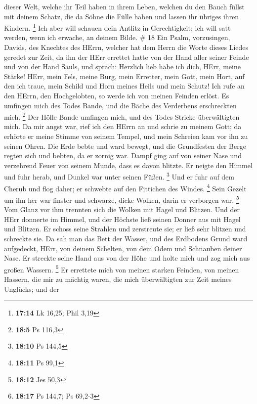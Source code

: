 dieser Welt, welche ihr Teil haben in ihrem Leben, welchen du den Bauch
füllst mit deinem Schatz, die da Söhne die Fülle haben und lassen ihr
übriges ihren Kindern. \footnote{\textbf{17:14} Lk 16,25; Phil 3,19}
 Ich aber will schauen dein Antlitz in Gerechtigkeit; ich
will satt werden, wenn ich erwache, an deinem Bilde. \# 18 
Ein Psalm, vorzusingen, Davids, des Knechtes des HErrn, welcher hat dem
Herrn die Worte dieses Liedes geredet zur Zeit, da ihn der HErr errettet
hatte von der Hand aller seiner Feinde und von der Hand Sauls,
 und sprach: Herzlich lieb habe ich dich, HErr, meine
Stärke!  HErr, mein Fels, meine Burg, mein Erretter, mein
Gott, mein Hort, auf den ich traue, mein Schild und Horn meines Heils
und mein Schutz!  Ich rufe an den HErrn, den Hochgelobten,
so werde ich von meinen Feinden erlöst.  Es umfingen mich
des Todes Bande, und die Bäche des Verderbens erschreckten mich.
\footnote{\textbf{18:5} Ps 116,3}  Der Hölle Bande umfingen
mich, und des Todes Stricke überwältigten mich.  Da mir
angst war, rief ich den HErrn an und schrie zu meinem Gott; da erhörte
er meine Stimme von seinem Tempel, und mein Schreien kam vor ihn zu
seinen Ohren.  Die Erde bebte und ward bewegt, und die
Grundfesten der Berge regten sich und bebten, da er zornig war.
 Dampf ging auf von seiner Nase und verzehrend Feuer von
seinem Munde, dass es davon blitzte.  Er neigte den Himmel
und fuhr herab, und Dunkel war unter seinen Füßen. \footnote{\textbf{18:10}
  Ps 144,5}  Und er fuhr auf dem Cherub und flog daher; er
schwebte auf den Fittichen des Windes. \footnote{\textbf{18:11} Ps 99,1}
 Sein Gezelt um ihn her war finster und schwarze, dicke
Wolken, darin er verborgen war. \footnote{\textbf{18:12} Jes 50,3}
 Vom Glanz vor ihm trennten sich die Wolken mit Hagel und
Blitzen.  Und der HErr donnerte im Himmel, und der Höchste
ließ seinen Donner aus mit Hagel und Blitzen.  Er schoss
seine Strahlen und zerstreute sie; er ließ sehr blitzen und schreckte
sie.  Da sah man das Bett der Wasser, und des Erdbodens
Grund ward aufgedeckt, HErr, von deinem Schelten, von dem Odem und
Schnauben deiner Nase.  Er streckte seine Hand aus von der
Höhe und holte mich und zog mich aus großen Wassern. \footnote{\textbf{18:17}
  Ps 144,7; Ps 69,2-3}  Er errettete mich von meinen
starken Feinden, von meinen Hassern, die mir zu mächtig waren,
 die mich überwältigten zur Zeit meines Unglücks; und der
